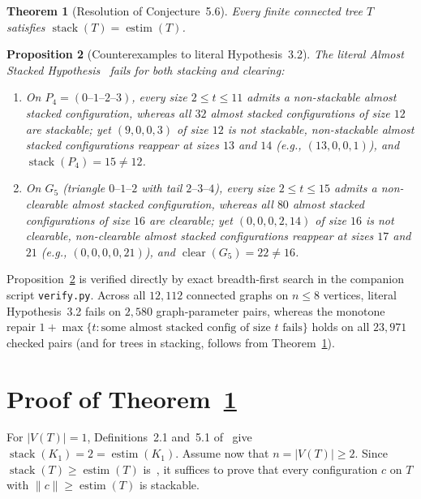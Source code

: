 \documentclass[11pt]{article}
\newtheorem{theorem}{Theorem}
\newtheorem{proposition}[theorem]{Proposition}
\DeclareMathOperator{\stack}{stack}
\DeclareMathOperator{\clear}{clear}
\DeclareMathOperator{\estim}{estim}
\begin{document}
\begin{theorem}[Resolution of Conjecture~5.6]\label{thm:trees}
Every finite connected tree $T$ satisfies $\stack(T) = \estim(T)$.
\end{theorem}

\begin{proposition}[Counterexamples to literal Hypothesis~3.2]\label{prop:ash}
The literal Almost Stacked Hypothesis~\cite[Hypothesis~3.2]{CS26} fails for both stacking and clearing:
\begin{enumerate}
  \item On $P_4 = (0\text{--}1\text{--}2\text{--}3)$, every size $2 \le t \le 11$ admits a non-stackable almost stacked configuration, whereas all $32$ almost stacked configurations of size $12$ are stackable; yet $(9,0,0,3)$ of size $12$ is not stackable, non-stackable almost stacked configurations reappear at sizes $13$ and $14$ (e.g., $(13,0,0,1)$), and $\stack(P_4) = 15 \neq 12$.
  \item On $G_5$ (triangle $0\text{--}1\text{--}2$ with tail $2\text{--}3\text{--}4$), every size $2 \le t \le 15$ admits a non-clearable almost stacked configuration, whereas all $80$ almost stacked configurations of size $16$ are clearable; yet $(0,0,0,2,14)$ of size $16$ is not clearable, non-clearable almost stacked configurations reappear at sizes $17$ and $21$ (e.g., $(0,0,0,0,21)$), and $\clear(G_5) = 22 \neq 16$.
\end{enumerate}
\end{proposition}

Proposition~\ref{prop:ash} is verified directly by exact breadth-first search in the companion script \texttt{verify.py}. Across all $12{,}112$ connected graphs on $n \le 8$ vertices, literal Hypothesis~3.2 fails on $2{,}580$ graph-parameter pairs, whereas the monotone repair $1 + \max\{t : \text{some almost stacked config of size } t \text{ fails}\}$ holds on all $23{,}971$ checked pairs (and for trees in stacking, follows from Theorem~\ref{thm:trees}).

\section{Proof of Theorem~\ref{thm:trees}}

For $|V(T)| = 1$, Definitions~2.1 and~5.1 of~\cite{CS26} give $\stack(K_1) = 2 = \estim(K_1)$. Assume now that $n = |V(T)| \ge 2$. Since $\stack(T) \ge \estim(T)$ is~\cite[Theorem~5.2]{CS26}, it suffices to prove that every configuration $c$ on $T$ with $\|c\| \ge \estim(T)$ is stackable.
\end{document}
